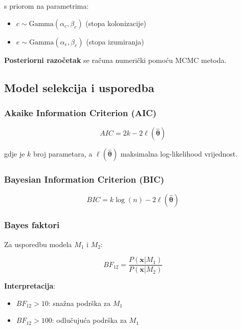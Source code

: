 \documentclass[11pt,oneside]{book}
\begin{document}
s priorom na parametrima:
\begin{itemize}
	\item $c \sim \text{Gamma}(\alpha_c, \beta_c)$ (stopa kolonizacije)
	\item $e \sim \text{Gamma}(\alpha_e, \beta_e)$ (stopa izumiranja)
\end{itemize}

\textbf{Posteriorni razočetak} se računa numerički pomoću MCMC metoda.

\subsection{Model selekcija i usporedba}

\subsubsection{Akaike Information Criterion (AIC)}

\begin{equation}
	AIC = 2k - 2\ell(\hat{\boldsymbol{\theta}})
\end{equation}

gdje je $k$ broj parametara, a $\ell(\hat{\boldsymbol{\theta}})$ maksimalna log-likelihood vrijednost.

\subsubsection{Bayesian Information Criterion (BIC)}

\begin{equation}
	BIC = k\log(n) - 2\ell(\hat{\boldsymbol{\theta}})
\end{equation}

\subsubsection{Bayes faktori}

Za usporedbu modela $M_1$ i $M_2$:

\begin{equation}
	BF_{12} = \frac{P(\mathbf{x} | M_1)}{P(\mathbf{x} | M_2)}
\end{equation}

\textbf{Interpretacija}:
\begin{itemize}
	\item $BF_{12} > 10$: snažna podrška za $M_1$
	\item $BF_{12} > 100$: odlučujuća podrška za $M_1$
\end{itemize}
\end{document}
